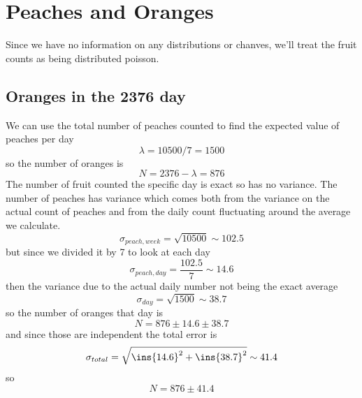 \clearpage
\section{Peaches and Oranges}
Since we have no information on any distributions or chanves, we'll treat the fruit counts as being distributed poisson.
\subsection{Oranges in the 2376 day}
We can use the total number of peaches counted to find the expected value of peaches per day 
\begin{equation}
    \lambda = 10500/7=1500
\end{equation}
so the number of oranges is 
\begin{equation}
    N = 2376-\lambda=876
\end{equation}
The number of fruit counted the specific day is exact so has no variance. The number of peaches has variance which comes both from the variance on the actual count of peaches and from the daily count fluctuating around the average we calculate.
\begin{equation}
    \sigma_{peach,week}=\sqrt{10500}\sim102.5
\end{equation}
but since we divided it by 7 to look at each day 
\begin{equation}
    \sigma_{peach,day}=\frac{102.5}{7}\sim14.6
\end{equation}
then the variance due to the actual daily number not being the exact average
\begin{equation}
    \sigma_{day}=\sqrt{1500}\sim38.7
\end{equation}
so the number of oranges that day is 
\begin{equation}
    N=876\pm14.6\pm38.7
\end{equation}
and since those are independent the total error is 
\begin{equation}
    \sigma_{total}=\sqrt{\ins{14.6}^2+\ins{38.7}^2}\sim41.4
\end{equation}
so 
\begin{equation}
    N=876\pm41.4
\end{equation}
